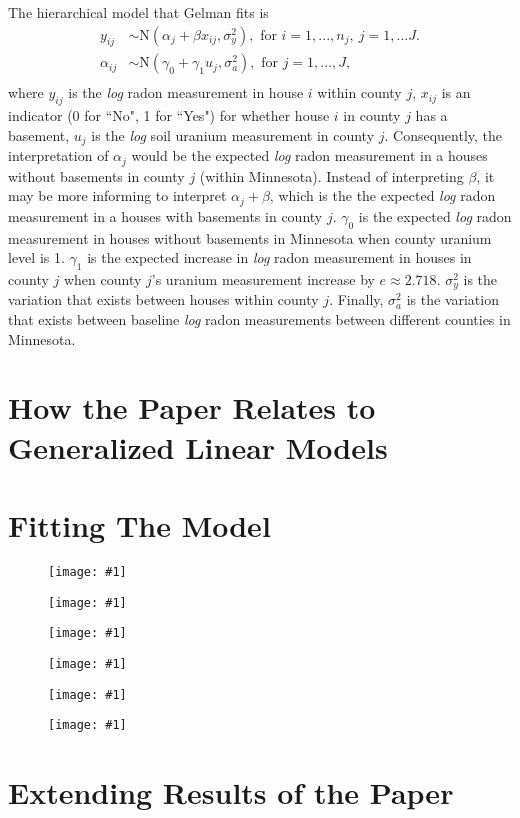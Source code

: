 \documentclass{article}
\def\beginmyfig{\begin{figure}[htbp]\begin{center}}
\def\endmyfig{\end{center}\end{figure}}
\def\myfig#1{\beginmyfig\texttt{[image: \#1]}\endmyfig}
\begin{document}
\noindent
The hierarchical model that Gelman fits is
\begin{align*}
  y_{ij}      &\sim \text{N}(\alpha_j + \beta x_{ij},\sigma_y^2),
               \text{ for }i=1,...,n_j,~j=1,...J.\\
  \alpha_{ij} &\sim \text{N}(\gamma_0 + \gamma_1 u_j,\sigma_a^2),
               \text{ for }j=1,...,J,\\
\end{align*}
where $y_{ij}$ is the \textit{log} radon measurement in house $i$ within county
$j$, $x_{ij}$ is an indicator (0 for ``No", 1 for ``Yes") for whether house $i$
in county $j$ has a basement, $u_j$ is the \textit{log} soil uranium
measurement in county $j$. Consequently, the interpretation of $\alpha_j$ would
be the expected \textit{log} radon measurement in a houses without basements in
county $j$ (within Minnesota). Instead of interpreting $\beta$, it may be more
informing to interpret $\alpha_j+\beta$, which is the the expected \textit{log}
radon measurement in a houses with basements in county $j$. $\gamma_0$ is the
expected \textit{log} radon measurement in houses without basements in
Minnesota when county uranium level is 1. $\gamma_1$ is the expected increase
in \textit{log} radon measurement in houses in county $j$ when county $j$'s
uranium measurement increase by $e\approx 2.718$. $\sigma_y^2$ is the variation
that exists between houses within county $j$. Finally, $\sigma_a^2$ is the
variation that exists between baseline \textit{log} radon measurements between
different counties in Minnesota.\\



\section{How the Paper Relates to Generalized Linear Models}

\section{Fitting The Model}
\myfig{images/apost.pdf}
\myfig{images/bpost.pdf}
\myfig{images/gpost.pdf}
\myfig{images/sy2post.pdf}
\myfig{images/sa2post.pdf}
\myfig{images/au.pdf}

\section{Extending Results of the Paper}
\end{document}
